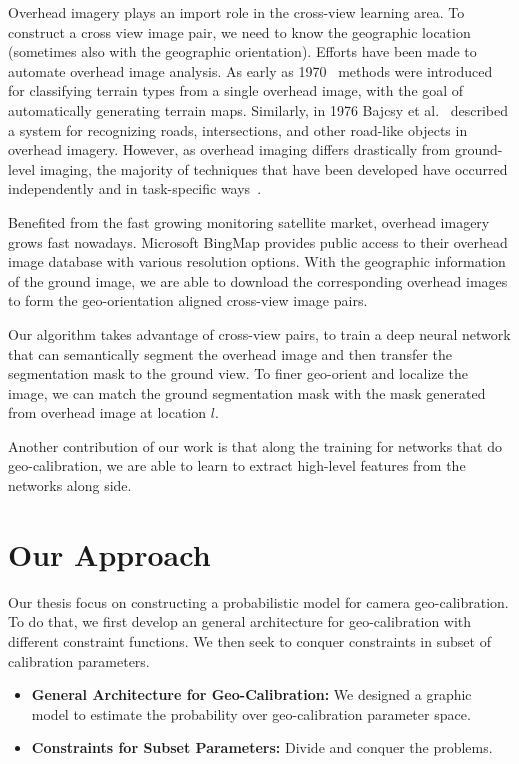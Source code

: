 Overhead imagery plays an import role in the cross-view learning area.
To construct a cross view image pair, we need to know the geographic
location (sometimes also with the geographic orientation).
 Efforts have been made to
automate overhead image analysis. As early as
1970~\cite{idelsohn1970learning} methods were introduced for
classifying terrain types from a single overhead image, with the goal
of automatically generating terrain maps.  Similarly, in 1976 Bajcsy
et al.~\cite{bajcsy1976computer} described a system for recognizing
roads, intersections, and other road-like objects in overhead imagery.
However, as overhead imaging differs drastically from ground-level
imaging, the majority of techniques that have been developed have
occurred independently and in task-specific ways~\cite{Rozen}.

Benefited from the fast growing monitoring satellite market, overhead
imagery grows fast nowadays. Microsoft BingMap provides public access
to their overhead image database with various resolution options. With
the geographic information of the ground image, we are able to
download the corresponding overhead images to form the geo-orientation
aligned cross-view image pairs.

Our algorithm takes advantage of cross-view pairs, to train a deep
neural network that can semantically segment the overhead image and
then transfer the segmentation mask to the ground view. To finer
geo-orient and localize the image, we can match the ground
segmentation mask with the mask generated from overhead image at
location $l$.

Another contribution of our work is that along the training for
networks that do geo-calibration, we are able to learn to extract
high-level features from the networks along side.


\section{Our Approach}
Our thesis focus on constructing a probabilistic model for camera
geo-calibration. To do that, we first develop an general architecture
for geo-calibration with different constraint functions. We then seek
to conquer constraints in subset of calibration parameters.

\begin{itemize}[noitemsep]
  \item \textbf{General Architecture for Geo-Calibration:}
  We designed a graphic model to estimate the probability over
  geo-calibration parameter space.

  \item \textbf{Constraints for Subset Parameters:}
  Divide and conquer the problems.

\end{itemize}


